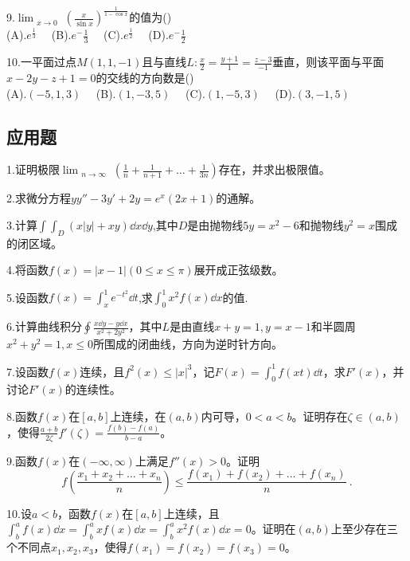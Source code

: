 9.$\displaystyle \lim_{\substack{x \to 0}} (\frac{x}{\sin x})^{\frac{1}{1-\cos x}}$的值为()\\
(A).$e^\frac{1}{3}\quad$     (B).$e^-\frac{1}{3}\quad$    (C).$e^\frac{1}{2}\quad$      (D).$e^-\frac{1}{2}\quad$

10.一平面过点$M(1,1,-1)$且与直线$L:\frac{x}{2}=\frac{y+1}{1}=\frac{z-3}{-1}$垂直，则该平面与平面$x-2y-z+1=0$的交线的方向数是()\\
(A).$(-5,1,3)\quad$  (B).$(1,-3,5)\quad$  (C).$(1,-5,3)\quad$   (D).$(3,-1,5)\quad$

\subsection{应用题}
1.证明极限$\displaystyle \lim_{\substack {n \to \infty}}(\frac{1}{n}+\frac{1}{n+1}+ \dots +\frac{1}{3n})$存在，并求出极限值。

2.求微分方程$yy''-3y'+2y=e^x(2x+1)$的通解。

3.计算$\int \int_{D}(x|y|+xy)\dd{x}\dd{y}$,其中$D$是由抛物线$5y=x^2-6$和抛物线$y^2=x$围成的闭区域。

4.将函数$f(x)=|x-1| (0\leqslant x \leqslant \pi)$展开成正弦级数。

5.设函数$f(x)=\int_{x}^{1}e^{-t^2}\dd{t}$,求$\int_{0}^{1}x^2f(x)\dd{x}$的值.

6.计算曲线积分$\oint \frac{x\dd{y}-y\dd{x}}{x^2+2y^2}$，其中$L$是由直线$x+y=1,y=x-1$和半圆周$x^2+y^2=1,x \leqslant 0$所围成的闭曲线，方向为逆时针方向。

7.设函数$f(x)$连续，且$f^2(x) \leqslant {|x|}^3$，记$F(x)=\int_{0}^{1}f(xt)\dd{t}$，求$F'(x)$，并讨论$F'(x)$的连续性。

8.函数$f(x)$在$[a,b]$上连续，在$(a,b)$内可导，$0<a<b$。证明存在$\zeta \in(a,b)$，使得$\frac{a+b}{2\zeta}f'(\zeta)=\frac{f(b)-f(a)}{b-a}$。

9.函数$f(x)$在$(-\infty,\infty)$上满足$f''(x)>0$。证明
\begin{equation}
f(\frac{x_1+x_2+\dots+x_n}{n}) \leqslant \frac{f(x_1)+f(x_2)+\dots+f(x_n)}{n}~.
\end{equation}


10.设$a<b$，函数$f(x)$在$[a,b]$上连续，且$\int_{b}^{a}f(x)\dd{x}=\int_{b}^{a}xf(x)\dd{x}=\int_{b}^{a}x^2f(x)\dd{x}=0$。证明在$(a,b)$上至少存在三个不同点$x_1,x_2,x_3$，使得$f(x_1)=f(x_2)=f(x_3)=0$。